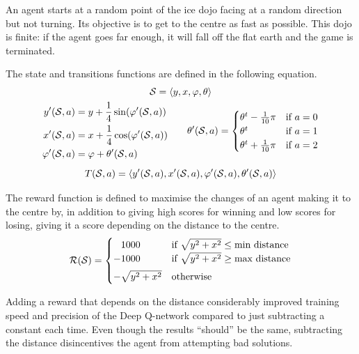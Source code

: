 An agent starts at a random point of the ice dojo facing at a random direction but not turning.
Its objective is to get to the centre as fast as possible.
This dojo is finite: if the agent goes far enough, it will fall off the flat earth and the game is terminated.

The state and transitions functions are defined in the following equation.
\newcommand{\statet}{\left< y, x, \varphi, \theta \right>}
\begin{gather*}
	\state = \statet \\
	\begin{aligned}
		y'(\state, a) &= y + \frac{1}{4} \sin(\varphi'(\state, a)) \\
		x'(\state, a) &= x + \frac{1}{4} \cos(\varphi'(\state, a)) \\
		\varphi'(\state, a) &= \varphi + \theta'(\state, a)
	\end{aligned}
	\qquad
	\theta'(\state, a)= \begin{cases}
		\theta^t - \frac{1}{10} \pi & \text{if } a = 0 \\
		\theta^t & \text{if } a = 1 \\
		\theta^t + \frac{1}{10} \pi & \text{if } a = 2
	\end{cases} \\[1ex]
	T(\state, a) = \left< y'(\state, a), x'(\state, a), \varphi'(\state, a), \theta'(\state, a) \right>
\end{gather*}

The reward function is defined to maximise the changes of an agent making it to the centre by, in addition to giving high scores for winning and low scores for losing, giving it a score depending on the distance to the centre.
\begin{equation*}
	\mathcal{R}(\mathcal{S}) = \begin{cases}
		\phantom{+}1000 & \text{if } \sqrt{y^2 + x^2} \leq \text{min distance} \\
		-1000 & \text{if } \sqrt{y^2 + x^2} \geq \text{max distance} \\[1ex]
		-\sqrt{y^2 + x^2} & \text{otherwise}
	\end{cases}
\end{equation*}

Adding a reward that depends on the distance considerably improved training speed and precision of the Deep Q-network compared to just subtracting a constant each time. Even though the results ``should'' be the same, subtracting the distance disincentives the agent from attempting bad solutions.

